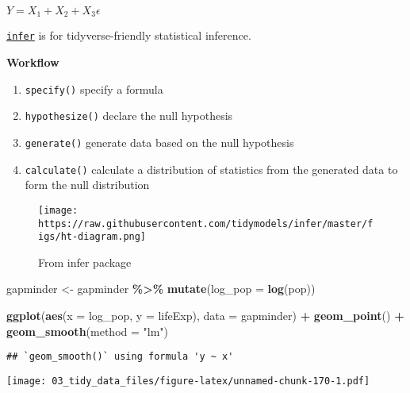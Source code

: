 \documentclass[
]{book}
\newenvironment{Shaded}{\begin{snugshade}}{\end{snugshade}}
\newcommand{\DataTypeTok}[1]{\textcolor[rgb]{0.13,0.29,0.53}{#1}}
\newcommand{\KeywordTok}[1]{\textcolor[rgb]{0.13,0.29,0.53}{\textbf{#1}}}
\newcommand{\NormalTok}[1]{#1}
\newcommand{\OperatorTok}[1]{\textcolor[rgb]{0.81,0.36,0.00}{\textbf{#1}}}
\newcommand{\StringTok}[1]{\textcolor[rgb]{0.31,0.60,0.02}{#1}}
\providecommand{\tightlist}{%
  \setlength{\itemsep}{0pt}\setlength{\parskip}{0pt}}
\begin{document}
\(Y = X_{1} + X_{2} + X_{3} \epsilon\)

\href{https://github.com/tidymodels/infer}{\texttt{infer}} is for tidyverse-friendly statistical inference.

\textbf{Workflow}

\begin{enumerate}
\def\labelenumi{\arabic{enumi}.}
\tightlist
\item
  \texttt{specify()} specify a formula
\item
  \texttt{hypothesize()} declare the null hypothesis
\item
  \texttt{generate()} generate data based on the null hypothesis
\item
  \texttt{calculate()} calculate a distribution of statistics from the generated data to form the null distribution
\end{enumerate}

\begin{figure}
\centering
\texttt{[image: https://raw.githubusercontent.com/tidymodels/infer/master/figs/ht-diagram.png]}
\caption{From infer package}
\end{figure}

\begin{Shaded}
\begin{Highlighting}[]
\NormalTok{gapminder \textless{}{-}}\StringTok{ }\NormalTok{gapminder }\OperatorTok{\%\textgreater{}\%}
\StringTok{  }\KeywordTok{mutate}\NormalTok{(}\DataTypeTok{log\_pop =} \KeywordTok{log}\NormalTok{(pop))}

\KeywordTok{ggplot}\NormalTok{(}\KeywordTok{aes}\NormalTok{(}\DataTypeTok{x =}\NormalTok{ log\_pop, }\DataTypeTok{y =}\NormalTok{ lifeExp), }\DataTypeTok{data =}\NormalTok{ gapminder) }\OperatorTok{+}
\StringTok{  }\KeywordTok{geom\_point}\NormalTok{() }\OperatorTok{+}
\StringTok{  }\KeywordTok{geom\_smooth}\NormalTok{(}\DataTypeTok{method =} \StringTok{"lm"}\NormalTok{)}
\end{Highlighting}
\end{Shaded}

\begin{verbatim}
## `geom_smooth()` using formula 'y ~ x'
\end{verbatim}

\texttt{[image: 03\_tidy\_data\_files/figure-latex/unnamed-chunk-170-1.pdf]}
\end{document}
